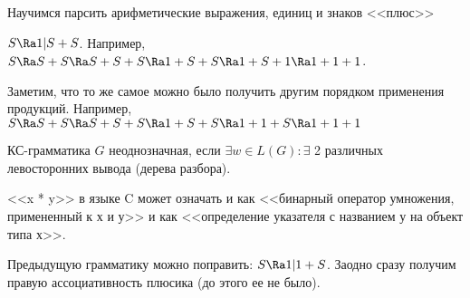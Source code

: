 \begin{exmp}
Научимся парсить арифметические выражения, единиц и знаков <<плюс>>

$S \Ra 1|S+S$. Например, $S \Ra S + S \Ra S + S + S \Ra 1 + S + S \Ra 1 + S + 1 \Ra 1 + 1 + 1$. %

Заметим, что то же самое можно было получить другим порядком применения продукций. Например, $S \Ra S + S \Ra S + S + S \Ra 1 + S + S \Ra 1 + 1 + S \Ra 1 + 1 + 1$ %
\end{exmp}

\begin{Def}
КС-грамматика $G$ неоднозначная, если $\exists w \in L(G) \colon \exists$ 2 различных левосторонних вывода (дерева разбора).
\end{Def}
\begin{exmp}
<<x * y>> в языке C может означать и как <<бинарный оператор умножения, примененный к х и у>> и как <<определение указателя с названием у на объект типа х>>.

Предыдущую грамматику можно поправить: $S \Ra 1|1+S$. Заодно сразу получим правую ассоциативность плюсика (до этого ее не было).
\end{exmp}                                        
